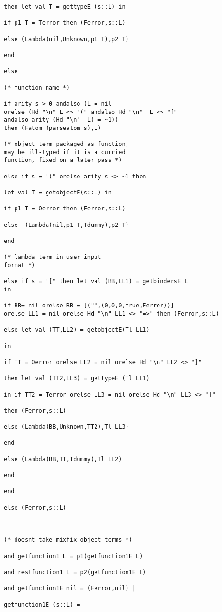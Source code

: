 \documentclass[12pt]{article}
\begin{document}
\begin{verbatim}
then let val T = gettypeE (s::L) in

if p1 T = Terror then (Ferror,s::L)

else (Lambda(nil,Unknown,p1 T),p2 T)

end

else

(* function name *)

if arity s > 0 andalso (L = nil 
orelse (Hd "\n" L <> "(" andalso Hd "\n"  L <> "["
andalso arity (Hd "\n"  L) = ~1))
then (Fatom (parseatom s),L)

(* object term packaged as function;
may be ill-typed if it is a curried
function, fixed on a later pass *)

else if s = "(" orelse arity s <> ~1 then

let val T = getobjectE(s::L) in

if p1 T = Oerror then (Ferror,s::L)

else  (Lambda(nil,p1 T,Tdummy),p2 T)

end

(* lambda term in user input
format *)

else if s = "[" then let val (BB,LL1) = getbindersE L
in

if BB= nil orelse BB = [("",(0,0,0,true,Ferror))]
orelse LL1 = nil orelse Hd "\n" LL1 <> "=>" then (Ferror,s::L)

else let val (TT,LL2) = getobjectE(Tl LL1) 

in

if TT = Oerror orelse LL2 = nil orelse Hd "\n" LL2 <> "]"

then let val (TT2,LL3) = gettypeE (Tl LL1)

in if TT2 = Terror orelse LL3 = nil orelse Hd "\n" LL3 <> "]"

then (Ferror,s::L)

else (Lambda(BB,Unknown,TT2),Tl LL3)

end

else (Lambda(BB,TT,Tdummy),Tl LL2)

end

end

else (Ferror,s::L)



(* doesnt take mixfix object terms *)

and getfunction1 L = p1(getfunction1E L)

and restfunction1 L = p2(getfunction1E L)

and getfunction1E nil = (Ferror,nil) |

getfunction1E (s::L) =


\end{verbatim}
\end{document}
